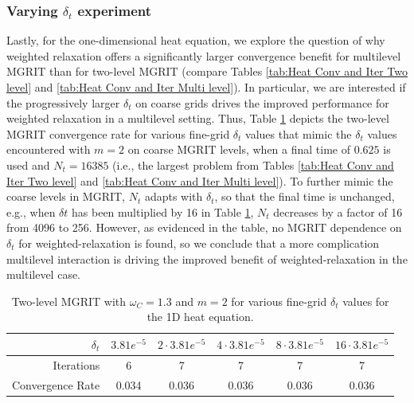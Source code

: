 \documentclass[VANCOUVER,STIX1COL]{WileyNJD-v2}
\begin{document}
\subsubsection{Varying $\delta_t$ experiment}
\label{sec:deltat_diffusion}
Lastly, for the one-dimensional heat equation, we explore the question of why weighted relaxation offers a 
significantly larger convergence benefit for multilevel MGRIT than for two-level MGRIT (compare Tables
\ref{tab:Heat Conv and Iter Two level} and \ref{tab:Heat Conv and Iter Multi level}).  In particular, 
we are interested if the progressively larger $\delta_t$ on coarse grids drives the improved 
performance for weighted relaxation in a multilevel setting.  Thus, Table \ref{tab:heat_vary_dt} depicts the
two-level MGRIT convergence rate for various fine-grid $\delta_t$ values that mimic the $\delta_t$ values 
encountered with $m=2$ on coarse MGRIT levels, when a final time of $0.625$ is used and $N_t=16385$ (i.e., the largest problem from Tables \ref{tab:Heat Conv and Iter Two level} and \ref{tab:Heat Conv and Iter Multi level}).  To further mimic the coarse levels in 
MGRIT, $N_t$ adapts with $\delta_t$, so that the final time is unchanged, e.g., when $\delta t$ has been 
multiplied by 16 in Table \ref{tab:heat_vary_dt}, $N_t$ decreases by a factor of 16 from 4096 to 256.  
However, as evidenced in the table, no MGRIT dependence on $\delta_t$ for 
weighted-relaxation is found, so we conclude that a more complication multilevel interaction is driving
the improved benefit of weighted-relaxation in the multilevel case.

\begin{table}[h!]
\centering
\begin{tabular}{r | c|c|c|c|c}
     $\delta_t$         & $3.81e^{-5}$ & $2 \cdot 3.81e^{-5}$  & $4 \cdot 3.81e^{-5}$  & $8 \cdot 3.81e^{-5}$  & $16 \cdot 3.81e^{-5}$ \\  \toprule        
     Iterations         & 6     & 7     & 7     & 7     & 7     \\
     Convergence Rate   & 0.034 & 0.036 & 0.036 & 0.036 & 0.036 
\end{tabular}
\caption{Two-level MGRIT with $\omega_{C}=1.3$ and $m=2$ for various fine-grid $\delta_t$ values for the 1D heat equation.}
\label{tab:heat_vary_dt}
\end{table}
\end{document}
